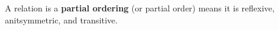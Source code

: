 
A relation is a {\bf partial ordering} (or partial order) means 
it is reflexive, anitsymmetric, and transitive.
